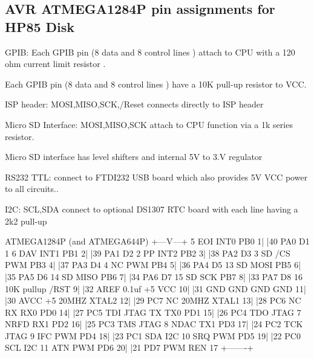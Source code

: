 \subsection*{A\-V\-R A\-T\-M\-E\-G\-A1284\-P pin assignments for H\-P85 Disk}


\begin{DoxyItemize}
\item G\-P\-I\-B\-: Each G\-P\-I\-B pin (8 data and 8 control lines ) attach to C\-P\-U with a 120 ohm current limit resistor .
\begin{DoxyItemize}
\item Each G\-P\-I\-B pin (8 data and 8 control lines ) have a 10\-K pull-\/up resistor to V\-C\-C.
\end{DoxyItemize}
\item I\-S\-P header\-: M\-O\-S\-I,M\-I\-S\-O,S\-C\-K,/\-Reset connects directly to I\-S\-P header
\item Micro S\-D Interface\-: M\-O\-S\-I,M\-I\-S\-O,S\-C\-K attach to C\-P\-U function via a 1k series resistor.
\begin{DoxyItemize}
\item Micro S\-D interface has level shifters and internal 5\-V to 3.\-V regulator
\end{DoxyItemize}
\item R\-S232 T\-T\-L\-: connect to F\-T\-D\-I232 U\-S\-B board which also provides 5\-V V\-C\-C power to all circuits..
\item I2\-C\-: S\-C\-L,S\-D\-A connect to optional D\-S1307 R\-T\-C board with each line having a 2k2 pull-\/up
\end{DoxyItemize}


\begin{DoxyPre}\end{DoxyPre}



\begin{DoxyPre}                       ATMEGA1284P (and ATMEGA644P) 
                       +---V---+ 
     5 EOI INT0  PB0  1|       |40  PA0      D1  1 
     6 DAV INT1  PB1  2|       |39  PA1      D2  2 
       PP  INT2  PB2  3|       |38  PA2      D3  3 
    SD /CS  PWM  PB3  4|       |37  PA3      D4  4 
       NC   PWM  PB4  5|       |36  PA4      D5 13 
    SD     MOSI  PB5  6|       |35  PA5      D6 14 
    SD     MISO  PB6  7|       |34  PA6      D7 15 
    SD      SCK  PB7  8|       |33  PA7      D8 16 
    10K pullup  /RST  9|       |32  AREF     0.1uf 
       +5        VCC 10|       |31  GND      GND   
       GND       GND 11|       |30  AVCC     +5    
    20MHZ      XTAL2 12|       |29  PC7      NC    
    20MHZ      XTAL1 13|       |28  PC6      NC    
       RX   RX0  PD0 14|       |27  PC5  TDI JTAG 
       TX   TX0  PD1 15|       |26  PC4  TDO JTAG 
     7 NRFD RX1  PD2 16|       |25  PC3  TMS JTAG 
     8 NDAC TX1  PD3 17|       |24  PC2  TCK JTAG 
     9 IFC  PWM  PD4 18|       |23  PC1  SDA I2C   
    10 SRQ  PWM  PD5 19|       |22  PC0  SCL I2C  
    11 ATN  PWM  PD6 20|       |21  PD7  PWM REN 17 
                       +-------+ 
\end{DoxyPre}






